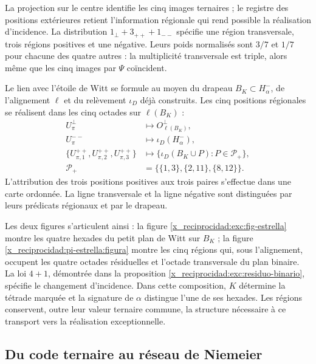 

La projection sur le centre identifie les cinq images ternaires ; le
registre des positions extérieures retient l'information régionale
qui rend possible la réalisation d'incidence. La distribution
\(1_\perp+3_{++}+1_{--}\) spécifie une région transversale, trois
régions positives et une négative. Leurs poids normalisés sont
\(3/7\) et \(1/7\) pour chacune des quatre autres : la
multiplicité transversale est triple, alors même que les cinq images par
\(\Psi\) coïncident.

Le lien avec l'étoile de Witt se formule au moyen du drapeau
\(B_K\subset H^-_\alpha\), de l'alignement \(\ell\) et du
relèvement \(\iota_D\) déjà construits. Les cinq positions régionales
se réalisent dans les cinq octades sur \(\ell(B_K)\) :
\[
\begin{aligned}
 U_\pi^\perp&\longmapsto O^\perp_{\ell(B_K)},\\
 U_\pi^{--}&\longmapsto\iota_D(H^-_\alpha),\\
 \{U_{\pi,1}^{++},U_{\pi,2}^{++},U_{\pi,3}^{++}\}
 &\longmapsto
 \{\iota_D(B_K\cup P):P\in\mathcal P_+\},\\
 \mathcal P_+&=\bigl\{\{1,3\},\{2,11\},\{8,12\}\bigr\}.
\end{aligned}
\]
L'attribution des trois positions positives aux trois paires
s'effectue dans une carte ordonnée. La ligne transversale et la ligne négative
sont distinguées par leurs prédicats régionaux et par le drapeau.

Les deux figures s'articulent ainsi : la figure
\ref{x_reciprocidad:exc:fig-estrella} montre les quatre hexades du petit plan
de Witt sur \(B_K\) ; la figure \ref{x_reciprocidad:pi-estrella:figura} montre
les cinq régions qui, sous l'alignement, occupent les quatre octades
résiduelles et l'octade transversale du plan binaire. La loi
\(4+1\), démontrée dans la proposition
\ref{x_reciprocidad:exc:residuo-binario}, spécifie le changement d'incidence. Dans cette
composition, \(K\) détermine la tétrade marquée et la signature de
\(\alpha\) distingue l'une de ses hexades. Les régions conservent,
outre leur valeur ternaire commune, la structure nécessaire à ce
transport vers la réalisation exceptionnelle.



\subsection{Du code ternaire au réseau de Niemeier}
\label{x_reciprocidad:exc:niemeier}

